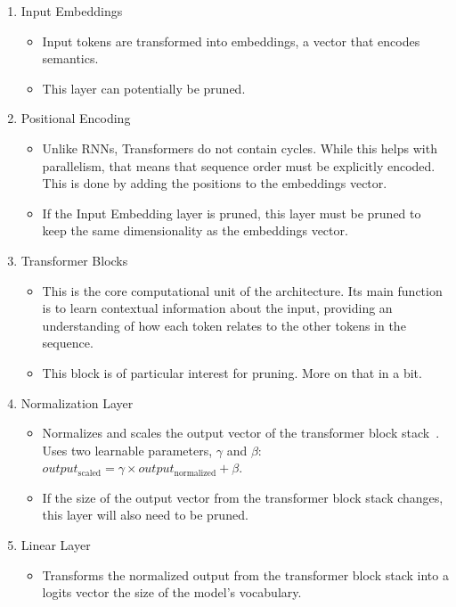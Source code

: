 \documentclass{article}
\begin{document}
    \begin{enumerate}
        \item Input Embeddings
        \begin{itemize}
            \item Input tokens are transformed into embeddings, a vector that encodes semantics.
            \item This layer can potentially be pruned.
        \end{itemize}
        \item Positional Encoding
        \begin{itemize}
            \item Unlike RNNs, Transformers do not contain cycles.
            While this helps with parallelism, that means that sequence order must be explicitly encoded.
            This is done by adding the positions to the embeddings vector.
            \item If the Input Embedding layer is pruned, this layer must be pruned to keep the same dimensionality as the embeddings vector.
        \end{itemize}
        \item Transformer Blocks
        \begin{itemize}
            \item This is the core computational unit of the architecture.
            Its main function is to learn contextual information about the input, providing an understanding of how each token relates to the other tokens in the sequence.
            \item This block is of particular interest for pruning.
            More on that in a bit.
        \end{itemize}
        \item Normalization Layer
        \begin{itemize}
            \item Normalizes and scales the output vector of the transformer block stack~\cite{ba2016layernormalization}.
            Uses two learnable parameters, $\gamma$ and $\beta$: $output_{\text{scaled}} = \gamma \times output_{\text{normalized}} + \beta$.
            \item If the size of the output vector from the transformer block stack changes, this layer will also need to be pruned.
        \end{itemize}
        \item Linear Layer
        \begin{itemize}
            \item Transforms the normalized output from the transformer block stack into a logits vector the size of the model's vocabulary.

\end{itemize}
\end{enumerate}
\end{document}

